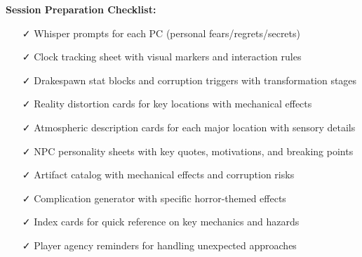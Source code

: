 \documentclass[11pt]{article}
\begin{document}
\textbf{Session Preparation Checklist:}
\begin{itemize}
\item [✓] Whisper prompts for each PC (personal fears/regrets/secrets)
\item [✓] Clock tracking sheet with visual markers and interaction rules
\item [✓] Drakespawn stat blocks and corruption triggers with transformation stages
\item [✓] Reality distortion cards for key locations with mechanical effects
\item [✓] Atmospheric description cards for each major location with sensory details
\item [✓] NPC personality sheets with key quotes, motivations, and breaking points
\item [✓] Artifact catalog with mechanical effects and corruption risks
\item [✓] Complication generator with specific horror-themed effects
\item [✓] Index cards for quick reference on key mechanics and hazards
\item [✓] Player agency reminders for handling unexpected approaches
\end{itemize}
\end{document}
